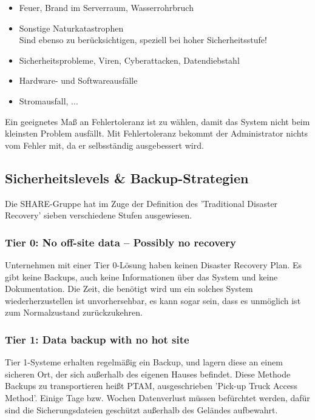 \documentclass[letterpaper, 12pt]{article}
\let\tempsubsection\subsection
\renewcommand\subsection[1]{\vspace{0cm}\tempsubsection{#1}\vspace{0cm}}
\let\tempsubsubsection\subsubsection
\renewcommand\subsubsection[1]{\vspace{0cm}\tempsubsubsection{#1}\vspace{0cm}}
\begin{document}
\begin{itemize}
	\item Feuer, Brand im Serverraum, Wasserrohrbruch
	\item Sonstige Naturkatastrophen \\
Sind ebenso zu berücksichtigen, speziell bei hoher Sicherheitsstufe!
	\item Sicherheitsprobleme, Viren, Cyberattacken, Datendiebstahl
	\item Hardware- und Softwareausfälle
	\item Stromausfall, ...
\end{itemize}

Ein geeignetes Maß an Fehlertoleranz ist zu wählen, damit das System nicht beim kleinsten Problem ausfällt. Mit Fehlertoleranz bekommt der Administrator nichts vom Fehler mit, da er selbsständig ausgebessert wird. \cite{ausarbeitungdis}

\subsection{Sicherheitslevels \& Backup-Strategien}

Die SHARE-Gruppe hat im Zuge der Definition des 'Traditional Disaster Recovery' sieben verschiedene Stufen ausgewiesen. \cite{ausarbeitungdis}

\subsubsection{Tier 0: No off-site data – Possibly no recovery}

Unternehmen mit einer Tier 0-Lösung haben keinen Disaster Recovery Plan. Es gibt keine Backups, auch keine Informationen über das System und keine Dokumentation. Die Zeit, die benötigt wird um ein solches System wiederherzustellen ist unvorhersehbar, es kann sogar
sein, dass es unmöglich ist zum Normalzustand zurückzukehren. \cite{ausarbeitungdis}

\subsubsection{Tier 1: Data backup with no hot site}

Tier 1-Systeme erhalten regelmäßig ein Backup, und lagern diese an einem sicheren Ort, der sich
außerhalb des eigenen Hauses befindet. Diese Methode
Backups zu transportieren heißt PTAM, ausgeschrieben ’Pick-up Truck Access Method’. Einige Tage bzw.
Wochen Datenverlust müssen befürchtet werden, dafür sind die Sicherungsdateien geschützt außerhalb des
Geländes aufbewahrt. \cite{ausarbeitungdis}
\end{document}
